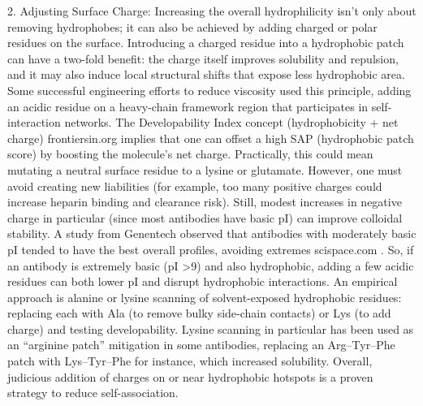 \documentclass[12pt]{article}
\begin{document}
2. Adjusting Surface Charge: Increasing the overall hydrophilicity isn’t only about removing hydrophobes; it can also be achieved by adding charged or polar residues on the surface. Introducing a charged residue into a hydrophobic patch can have a two-fold benefit: the charge itself improves solubility and repulsion, and it may also induce local structural shifts that expose less hydrophobic area. Some successful engineering efforts to reduce viscosity used this principle, adding an acidic residue on a heavy-chain framework region that participates in self-interaction networks. The Developability Index concept (hydrophobicity + net charge)
frontiersin.org
 implies that one can offset a high SAP (hydrophobic patch score) by boosting the molecule’s net charge. Practically, this could mean mutating a neutral surface residue to a lysine or glutamate. However, one must avoid creating new liabilities (for example, too many positive charges could increase heparin binding and clearance risk). Still, modest increases in negative charge in particular (since most antibodies have basic pI) can improve colloidal stability. A study from Genentech observed that antibodies with moderately basic pI tended to have the best overall profiles, avoiding extremes
scispace.com
. So, if an antibody is extremely basic (pI >9) and also hydrophobic, adding a few acidic residues can both lower pI and disrupt hydrophobic interactions. An empirical approach is alanine or lysine scanning of solvent-exposed hydrophobic residues: replacing each with Ala (to remove bulky side-chain contacts) or Lys (to add charge) and testing developability. Lysine scanning in particular has been used as an “arginine patch” mitigation in some antibodies, replacing an Arg–Tyr–Phe patch with Lys–Tyr–Phe for instance, which increased solubility. Overall, judicious addition of charges on or near hydrophobic hotspots is a proven strategy to reduce self-association.
\end{document}
